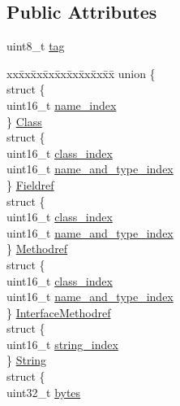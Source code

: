 \subsection*{Public Attributes}
\begin{DoxyCompactItemize}
\item 
uint8\+\_\+t \hyperlink{class_cp_info_ac20d96c33f871bde2e903708a215a2dc}{tag}
\item 
\begin{tabbing}
xx\=xx\=xx\=xx\=xx\=xx\=xx\=xx\=xx\=\kill
union \{\\
\>struct \{\\
\>\>uint16\_t \hyperlink{class_cp_info_a8337463c52221eaead88f232ded768a7}{name\_index}\\
\>\} \hyperlink{class_cp_info_a8e42eb58082f93477cecc14d96c50689}{Class}\\
\>struct \{\\
\>\>uint16\_t \hyperlink{class_cp_info_abde12c60f120eb082631fd0554fbe2f3}{class\_index}\\
\>\>uint16\_t \hyperlink{class_cp_info_a3007bcc993f983836f419c3d8f8cb835}{name\_and\_type\_index}\\
\>\} \hyperlink{class_cp_info_a9f594a9412a1d3bfc086efc127fb528a}{Fieldref}\\
\>struct \{\\
\>\>uint16\_t \hyperlink{class_cp_info_abde12c60f120eb082631fd0554fbe2f3}{class\_index}\\
\>\>uint16\_t \hyperlink{class_cp_info_a3007bcc993f983836f419c3d8f8cb835}{name\_and\_type\_index}\\
\>\} \hyperlink{class_cp_info_ac86976e076271c25fb990d34cbf93eb1}{Methodref}\\
\>struct \{\\
\>\>uint16\_t \hyperlink{class_cp_info_abde12c60f120eb082631fd0554fbe2f3}{class\_index}\\
\>\>uint16\_t \hyperlink{class_cp_info_a3007bcc993f983836f419c3d8f8cb835}{name\_and\_type\_index}\\
\>\} \hyperlink{class_cp_info_ad489482113b9905436258696227b9d21}{InterfaceMethodref}\\
\>struct \{\\
\>\>uint16\_t \hyperlink{class_cp_info_a4b2f7aa4ac461ac4d860d566c5e3323e}{string\_index}\\
\>\} \hyperlink{class_cp_info_a9e47b825b6e22ad57a9b78cf430cd6bc}{String}\\
\>struct \{\\
\>\>uint32\_t \hyperlink{class_cp_info_aff3858879ad5feb452a5fc0504e99c1b}{bytes}\\

\end{tabbing}
\end{DoxyCompactItemize}
